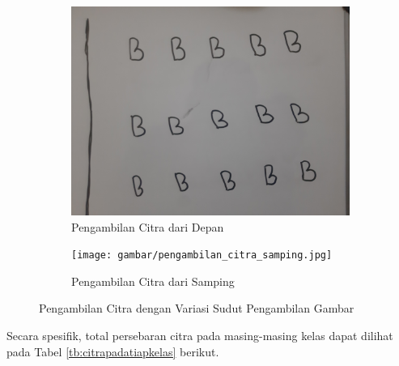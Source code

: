 \begin{figure}[H]
  \begin{subfigure}{.5\textwidth}
    \centering
    \captionsetup{width=.8\linewidth}
    \includegraphics[width=.85\linewidth]{gambar/pengambilan_citra_depan.jpg}
    \caption{Pengambilan Citra dari Depan}
    \label{fig:citradepan}
  \end{subfigure}%
  \begin{subfigure}{.5\textwidth}
    \centering
    \captionsetup{width=.8\linewidth}
    \texttt{[image: gambar/pengambilan\_citra\_samping.jpg]}
    \caption{Pengambilan Citra dari Samping}
    \label{fig:citrasamping}
  \end{subfigure}
  \caption{Pengambilan Citra dengan Variasi Sudut Pengambilan Gambar}
  \label{fig:pengambilancitrabervariasi}
\end{figure}

Secara spesifik, total persebaran citra pada masing-masing kelas dapat dilihat pada Tabel \ref{tb:citrapadatiapkelas} berikut. \par

